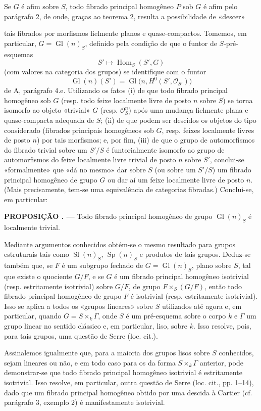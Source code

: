 \documentclass[11pt,twoside,openany]{book}
\numberwithin{equation}{section}
\newcommand{\src}[1]{%
  \phantomsection\hypertarget{src:#1}{}%
  \marginpar{\raggedleft\footnotesize\sffamily #1}%
}
\theoremstyle{plain}
\theoremstyle{definition}
\theoremstyle{remark}
\newcommand{\result}[2]{%
  \par\medskip\noindent\textbf{#1%
  \if\relax\detokenize{#2}\relax\else\space#2\fi. ---}\enspace
}
\newcommand{\FgaUnitKey}{frontmatter}
\renewcommand{\src}[1]{%
  \phantomsection\hypertarget{src:\FgaUnitKey:#1}{}%
  \marginpar{\raggedleft\footnotesize\sffamily #1}%
}
\begin{document}
Se $G$ é afim sobre $S$, todo fibrado principal homogêneo $P$ sob $G$ é afim
pelo parágrafo 2, de onde, graças ao teorema 2, resulta a possibilidade de
«descer»

\src{326}
tais fibrados por morfismos fielmente planos e quase-compactos. Tomemos, em
particular, $G=\operatorname{Gl}(n)_S$, definido pela condição de que o
funtor de $S$-pré-esquemas
\[
  S'\longmapsto\operatorname{Hom}_S(S',G)
\]
(com valores na categoria dos grupos) se identifique com o funtor
\[
  \operatorname{Gl}(n)(S')
  =\operatorname{Gl}\bigl(n,H^0(S',\mathcal O_{S'})\bigr)
\]
de A, parágrafo 4.e. Utilizando os fatos (i) de que todo fibrado principal
homogêneo sob $G$ (resp. todo feixe localmente livre de posto $n$ sobre $S$) se
torna isomorfo ao objeto «trivial» $G$ (resp. $\mathcal O_S^n$) após uma mudança
fielmente plana e quase-compacta adequada de $S$; (ii) de que podem ser descidos
os objetos do tipo considerado (fibrados principais homogêneos sob $G$,
resp. feixes localmente livres de posto $n$) por tais morfismos; e, por fim,
(iii) de que o grupo de automorfismos do fibrado trivial sobre um $S'/S$ é
funtorialmente isomorfo ao grupo de automorfismos do feixe localmente livre
trivial de posto $n$ sobre $S'$, conclui-se «formalmente» que «dá no mesmo»
dar sobre $S$ (ou sobre um $S'/S$) um fibrado principal homogêneo de grupo $G$
ou dar aí um feixe localmente livre de posto $n$. (Mais precisamente, tem-se
uma equivalência de categorias fibradas.) Conclui-se, em particular:

\result{PROPOSIÇÃO}{6.1} Todo fibrado principal homogêneo de grupo
$\operatorname{Gl}(n)_S$ é localmente trivial.

Mediante argumentos conhecidos obtém-se o mesmo resultado para grupos
estruturais tais como $\operatorname{Sl}(n)_S$, $\operatorname{Sp}(n)_S$ e
produtos de tais grupos. Deduz-se também que, se $F$ é um subgrupo fechado
de $G=\operatorname{Gl}(n)_S$, plano sobre $S$, tal que existe o quociente
$G/F$, e se $G$ é um fibrado principal homogêneo isotrivial (resp.
estritamente isotrivial) sobre $G/F$, de grupo $F\times_S(G/F)$, então todo
fibrado principal homogêneo de grupo $F$ é isotrivial (resp. estritamente
isotrivial). Isso se aplica a todos os «grupos lineares» sobre $S$ utilizados
até agora e, em particular, quando $G=S\times_k\Gamma$, onde $S$ é um
pré-esquema sobre o corpo $k$ e $\Gamma$ um grupo linear no sentido clássico
e, em particular, liso, sobre $k$. Isso resolve, pois, para tais grupos, uma
questão de Serre (loc. cit.).

Assinalemos igualmente que, para a maioria dos grupos lisos sobre $S$ conhecidos,
sejam lineares ou não, e em todo caso para os da forma
$S\times_k\Gamma$ anterior, pode demonstrar-se que todo fibrado principal
homogêneo isotrivial é estritamente isotrivial. Isso resolve, em particular,
outra questão de Serre (loc. cit., pp. 1--14), dado que um fibrado principal
homogêneo obtido por uma descida à Cartier (cf. parágrafo 3, exemplo 2) é
manifestamente isotrivial.
\end{document}
